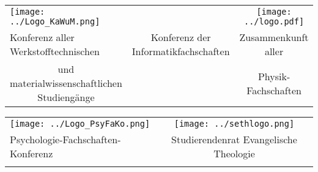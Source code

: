 \documentclass[DIV=calc]{scrartcl}
\begin{document}
\begin{table}[htb]
    \centering
    \addtolength{\leftskip}{-3.2cm}
    \addtolength{\rightskip}{-3cm}
    \vspace{-2cm}
    \begin{tabular}{ccc}
         \multicolumn{1}{l}{\texttt{[image: ../Logo\_KaWuM.png]}} &  &  \texttt{[image: ../logo.pdf]}\\
         \multicolumn{1}{l}{Konferenz aller Werkstofftechnischen} & Konferenz der Informatikfachschaften & Zusammenkunft aller\\
         und materialwissenschaftlichen Studiengänge & & Physik-Fachschaften \\
    \end{tabular}
    \label{tab:logos1}
\end{table} 

\begin{table}[htb]
    \centering
    \addtolength{\leftskip}{-3.2cm}
    \addtolength{\rightskip}{-3cm}
    \vspace{-0.3cm}
    \begin{tabular}{cc}
         \multicolumn{1}{l}{\texttt{[image: ../Logo\_PsyFaKo.png]}} & \texttt{[image: ../sethlogo.png]}\\
         \multicolumn{1}{l}{Psychologie-Fachschaften-Konferenz} & Studierendenrat Evangelische Theologie \\
         & \\
    \end{tabular}
    \label{tab:logos}
\end{table}


\end{document}
